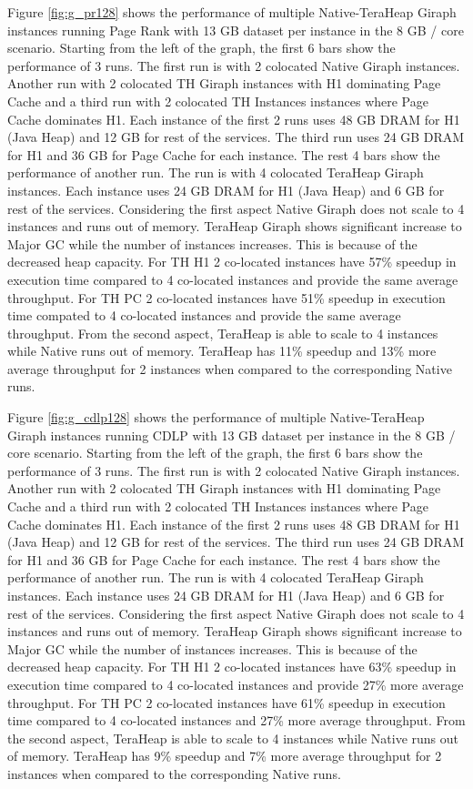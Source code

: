 Figure \ref{fig:g_pr128} shows the performance of multiple
Native-TeraHeap Giraph instances running Page Rank with 13 GB
dataset per instance in the 8 GB / core scenario.
Starting from the left of the graph, the first 6 bars show the
performance of 3 runs. The first run is with 2 colocated Native Giraph instances.
Another run with 2 colocated TH Giraph instances with H1 dominating Page Cache
and a third run with 2 colocated TH Instances instances where Page Cache dominates H1.
Each instance of the first 2 runs uses 48 GB DRAM for H1 (Java Heap) and 12 GB for rest of the services.
The third run uses 24 GB DRAM for H1 and 36 GB for Page Cache for each instance.
The rest 4 bars show the performance of another run. The run is with 4 colocated TeraHeap Giraph instances.
Each instance uses 24 GB DRAM for H1 (Java Heap) and 6 GB for rest of the services.
Considering the first aspect Native Giraph does not scale to 4 instances and runs out of memory. TeraHeap Giraph shows significant increase to Major GC while the number of instances increases. This is because of the decreased heap capacity. For TH H1 2 co-located instances have 57\% speedup in execution time compared to 4 co-located instances and provide the same average throughput. For TH PC 2 co-located instances have 51\% speedup in execution time compated to 4 co-located instances and provide the same average throughput.
From the second aspect, TeraHeap is able to scale to 4 instances while Native runs out of memory. TeraHeap has 11\% speedup and 13\% more average throughput for 2 instances when compared to the corresponding Native runs.

Figure \ref{fig:g_cdlp128} shows the performance of multiple
Native-TeraHeap Giraph instances running CDLP with 13 GB
dataset per instance in the 8 GB / core scenario.
Starting from the left of the graph, the first 6 bars show the
performance of 3 runs. The first run is with 2 colocated Native Giraph instances.
Another run with 2 colocated TH Giraph instances with H1 dominating Page Cache
and a third run with 2 colocated TH Instances instances where Page Cache dominates H1.
Each instance of the first 2 runs uses 48 GB DRAM for H1 (Java Heap) and 12 GB for rest of the services.
The third run uses 24 GB DRAM for H1 and 36 GB for Page Cache for each instance.
The rest 4 bars show the performance of another run. The run is with 4 colocated TeraHeap Giraph instances.
Each instance uses 24 GB DRAM for H1 (Java Heap) and 6 GB for rest of the services.
Considering the first aspect Native Giraph does not scale to 4 instances and runs out of memory. TeraHeap Giraph shows significant increase to Major GC while the number of instances increases. This is because of the decreased heap capacity. For TH H1 2 co-located instances have 63\% speedup in execution time compared to 4 co-located instances and provide 27\% more average throughput. For TH PC 2 co-located instances have 61\% speedup in execution time compared to 4 co-located instances and 27\% more average throughput. From the second aspect, TeraHeap is able to scale to 4 instances while Native runs out of memory. TeraHeap has 9\% speedup and 7\% more average throughput for 2 instances when compared to the corresponding Native runs.

